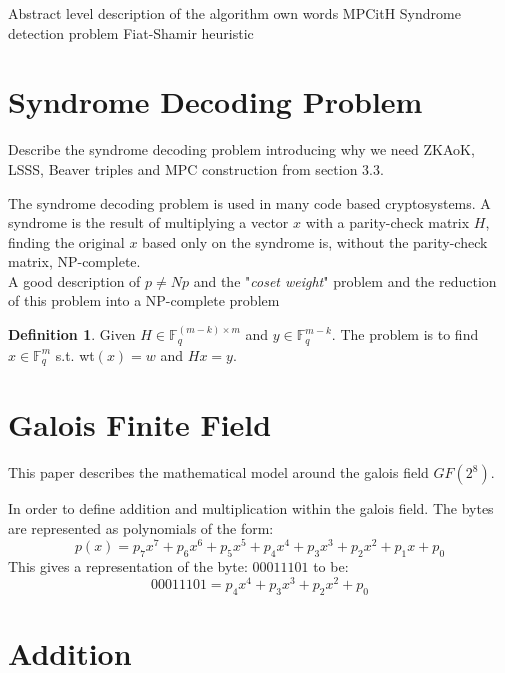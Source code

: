 \documentclass[twoside,11pt,openright]{report}
\theoremstyle{definition}
\newtheorem{definition}{Definition}[section]
\theoremstyle{plain}
\begin{document}
Abstract level description of the algorithm own words
MPCitH
Syndrome detection problem
Fiat-Shamir heuristic


\section{Syndrome Decoding Problem}
\label{sec:syndrome}

Describe the syndrome decoding problem introducing why we need ZKAoK, LSSS, Beaver triples and MPC construction from \cite{baum2020concretely} section 3.3.

The syndrome decoding problem is used in many code based cryptosystems. A syndrome is the result of multiplying a vector $x$ with a parity-check matrix $H$, finding the original $x$ based only on the syndrome is, without the parity-check matrix, NP-complete.
\\
A good description of \textbf{$p \neq Np$} and the "\textit{coset weight}" problem and the reduction of this problem into a NP-complete problem \cite{berlekamp1978inherent}

\begin{definition}
  \label{def:syndrome}
  Given $H \in \mathbb{F}^{(m-k)\times m}_q$ and $y \in \mathbb{F}^{m-k}_q$. The problem is to find $x \in \mathbb{F}^m_q$ s.t. wt$(x) = w$ and $Hx = y$.
\end{definition}


\section{Galois Finite Field}
\label{sec:gf256}
This paper \cite{brownadvanced} describes the mathematical model around the galois field $GF(2^8)$.

In order to define addition and multiplication within the galois field. The bytes are represented as polynomials of the form:
\begin{equation}
  \label{eq:poly}
  p(x) = p_7x^7 + p_6x^6 + p_5x^5 + p_4x^4 + p_3x^3 + p_2x^2 + p_1x + p_0
\end{equation}
This gives a representation of the byte: ${00011101}$ to be:
\begin{equation}
  \label{eq:example_poly}
  00011101 = p_4x^4 + p_3x^3 + p_2x^2 + p_0
\end{equation}


\section{Addition}
\end{document}
